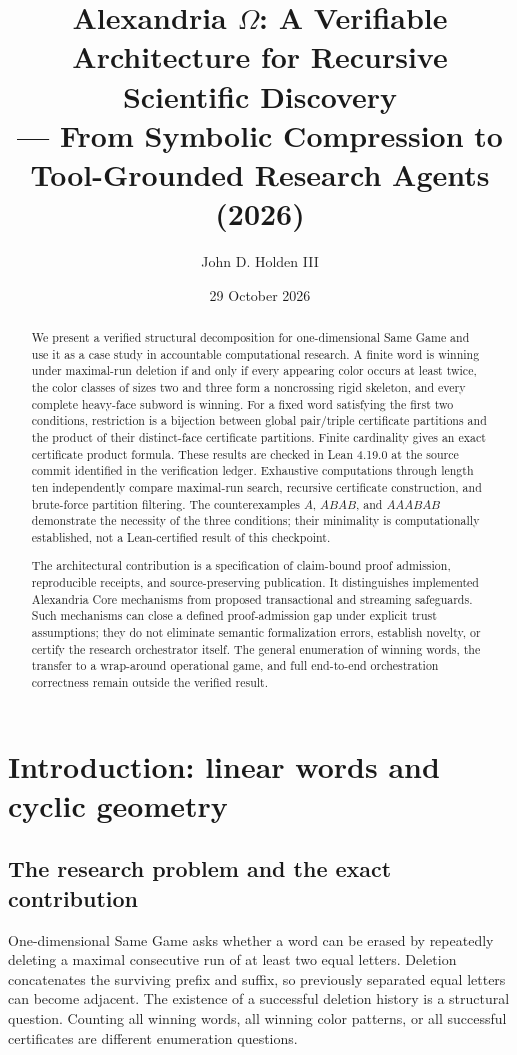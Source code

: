 \documentclass[11pt,reqno]{amsart}
\title[Alexandria: verified discovery and face decomposition]{Alexandria $\Omega$: A Verifiable Architecture for Recursive Scientific Discovery\\
--- From Symbolic Compression to Tool-Grounded Research Agents (2026)}
\author{John D. Holden III}
\date{29 October 2026}
\theoremstyle{definition}
\begin{document}
\begin{abstract}
We present a verified structural decomposition for one-dimensional Same Game and use it as a case study in accountable computational research. A finite word is winning under maximal-run deletion if and only if every appearing color occurs at least twice, the color classes of sizes two and three form a noncrossing rigid skeleton, and every complete heavy-face subword is winning. For a fixed word satisfying the first two conditions, restriction is a bijection between global pair/triple certificate partitions and the product of their distinct-face certificate partitions. Finite cardinality gives an exact certificate product formula. These results are checked in Lean 4.19.0 at the source commit identified in the verification ledger. Exhaustive computations through length ten independently compare maximal-run search, recursive certificate construction, and brute-force partition filtering. The counterexamples $A$, $ABAB$, and $AAABAB$ demonstrate the necessity of the three conditions; their minimality is computationally established, not a Lean-certified result of this checkpoint.

The architectural contribution is a specification of claim-bound proof admission, reproducible receipts, and source-preserving publication. It distinguishes implemented Alexandria Core mechanisms from proposed transactional and streaming safeguards. Such mechanisms can close a defined proof-admission gap under explicit trust assumptions; they do not eliminate semantic formalization errors, establish novelty, or certify the research orchestrator itself. The general enumeration of winning words, the transfer to a wrap-around operational game, and full end-to-end orchestration correctness remain outside the verified result.
\end{abstract}
\maketitle
\tableofcontents

\section{Introduction: linear words and cyclic geometry}\label{sec:introduction}
\subsection{The research problem and the exact contribution}
One-dimensional Same Game asks whether a word can be erased by repeatedly deleting a maximal consecutive run of at least two equal letters. Deletion concatenates the surviving prefix and suffix, so previously separated equal letters can become adjacent. The existence of a successful deletion history is a structural question. Counting all winning words, all winning color patterns, or all successful certificates are different enumeration questions.
\end{document}

